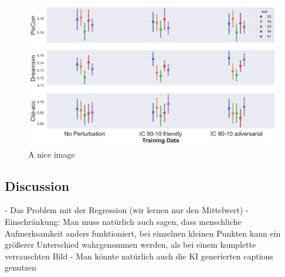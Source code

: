 \begin{figure}[ht]
    \centering
    \includegraphics[width=1\textwidth]{plots/advpert_reconstruction_art_ic_90-10.png}
    \caption{A nice image}\label{fig:advpert_reconstruction_art_ic_90}
\end{figure}






\subsection{Discussion}

- Das Problem mit der Regression (wir lernen nur den Mittelwert)
- Einschränkung: Man muss natürlich auch sagen, dass menschliche Aufmerksamkeit anders funktioniert, bei einzelnen kleinen Punkten kann ein größerer Unterschied wahrgenommen werden, als bei einem komplette verrauschten Bild
- Man könnte natürlich auch die KI generierten captions genutzen

